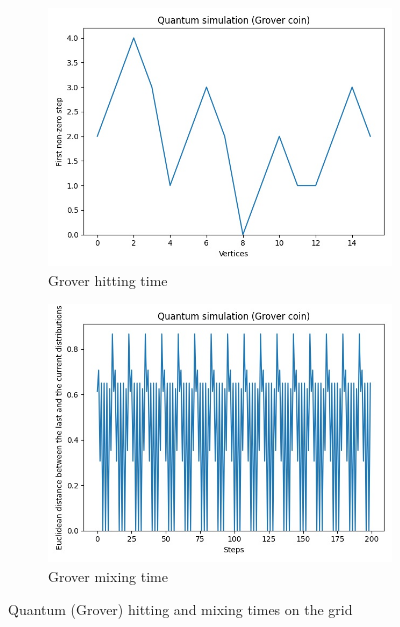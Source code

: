 \begin{figure}[H]
  \centering
  \begin{subfigure}{.45\linewidth}
    \centering
    \includegraphics[width=\linewidth]{./figures/results/grid/grover_hitting_time.jpg}
    \caption{Grover hitting time}
  \end{subfigure}
  \begin{subfigure}{.45\linewidth}
    \centering
    \includegraphics[width=\linewidth]{./figures/results/grid/grover_mixing_time.jpg}
    \caption{Grover mixing time}
  \end{subfigure}
  \caption{Quantum (Grover) hitting and mixing times on the grid}
\end{figure}


